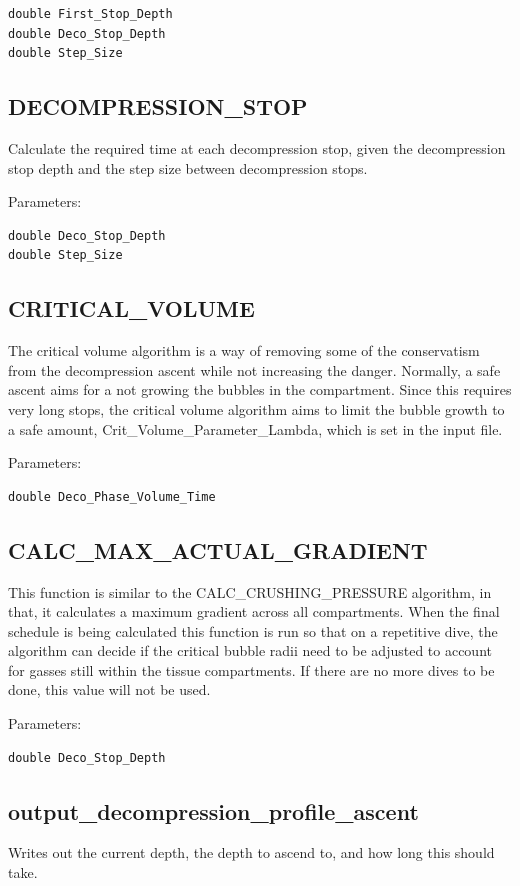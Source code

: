 \documentclass[12pt]{article}
\begin{document}
\begin{verbatim}
double First_Stop_Depth
double Deco_Stop_Depth
double Step_Size
\end{verbatim}


\subsection{DECOMPRESSION\_STOP}

Calculate the required time at each decompression stop, given the decompression stop depth
and the step size between decompression stops.

Parameters:
\begin{verbatim}
double Deco_Stop_Depth
double Step_Size
\end{verbatim}


\subsection{CRITICAL\_VOLUME}

The critical volume algorithm is a way of removing some of the conservatism from the decompression ascent while not
increasing the danger. Normally, a safe ascent aims for a not growing the bubbles in the compartment. Since this
requires very long stops, the critical volume algorithm aims to limit the bubble growth to a safe amount, Crit\_Volume\_Parameter\_Lambda, which is set in the input file.

Parameters:
\begin{verbatim}
double Deco_Phase_Volume_Time
\end{verbatim}


\subsection{CALC\_MAX\_ACTUAL\_GRADIENT}
This function is similar to the CALC\_CRUSHING\_PRESSURE algorithm, in that, it calculates
a maximum gradient across all compartments. When the final schedule is being calculated
this function is run so that on a repetitive dive, the algorithm can decide if the
critical bubble radii need to be adjusted to account for gasses still within the 
tissue compartments. If there are no more dives to be done, this value will not be used.

Parameters:
\begin{verbatim}
double Deco_Stop_Depth 
\end{verbatim}

\subsection{output\_decompression\_profile\_ascent}
Writes out the current depth, the depth to ascend to, and how long this should take.
\end{document}
